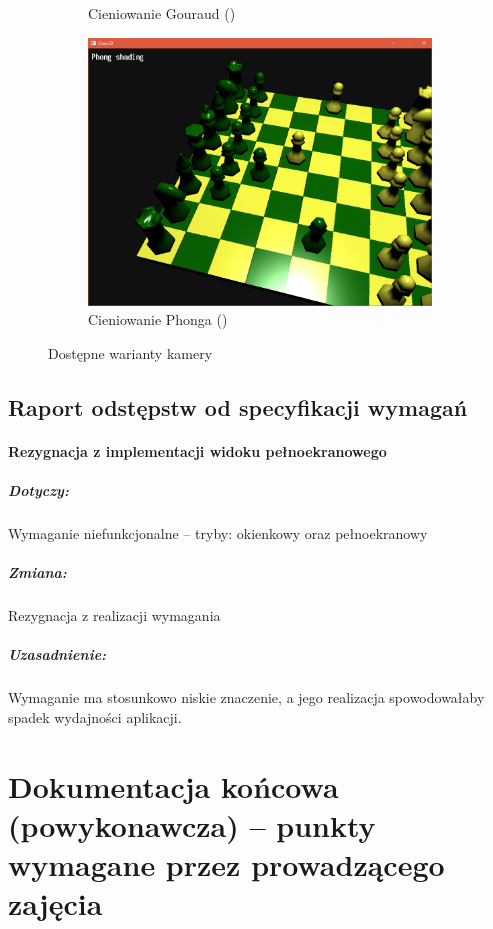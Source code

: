 \documentclass[10pt,a4paper]{article}
\begin{document}
\begin{figure}[H]
\begin{subfigure}[b]{0.3\textwidth}
		\caption{Cieniowanie Gouraud ()}
	\end{subfigure}
	\begin{subfigure}[b]{0.3\textwidth}
		\includegraphics[width=\textwidth]{screenshots/10_phong_shading.png}
		\caption{Cieniowanie Phonga ()}
	\end{subfigure}
	\caption{Dostępne warianty kamery}
\end{figure}

\subsection{Raport odstępstw od specyfikacji wymagań}

\paragraph{Rezygnacja z implementacji widoku pełnoekranowego}
\subparagraph{Dotyczy:} Wymaganie niefunkcjonalne -- tryby: okienkowy oraz pełnoekranowy
\subparagraph{Zmiana:} Rezygnacja z realizacji wymagania
\subparagraph{Uzasadnienie:} Wymaganie ma stosunkowo niskie znaczenie, a jego realizacja spowodowałaby spadek wydajności aplikacji.

\section{Dokumentacja końcowa (powykonawcza) -- punkty wymagane przez prowadzącego zajęcia}

\end{document}
